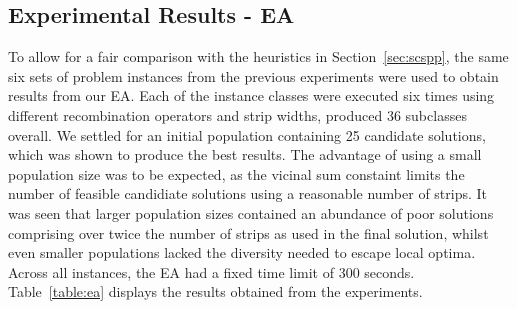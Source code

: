 \documentclass{elsarticle}
\begin{document}
\subsection{Experimental Results - EA}
\label{sub:expea}
\noindent To allow for a fair comparison with the heuristics in Section~\ref{sec:scspp}, the same six sets of problem instances from the previous experiments were used to obtain results from our EA. Each of the instance classes were executed six times using different recombination operators and strip widths, produced 36 subclasses overall. We settled for an initial population containing 25 candidate solutions, which was shown to produce the best results. The advantage of using a small population size was to be expected, as the vicinal sum constaint limits the number of feasible candidiate solutions using a reasonable number of strips. It was seen that larger population sizes contained an abundance of poor solutions comprising over twice the number of strips as used in the final solution, whilst even smaller populations lacked the diversity needed to escape local optima. Across all instances, the EA had a fixed time limit of 300 seconds. Table~\ref{table:ea} displays the results obtained from the experiments.
\end{document}
